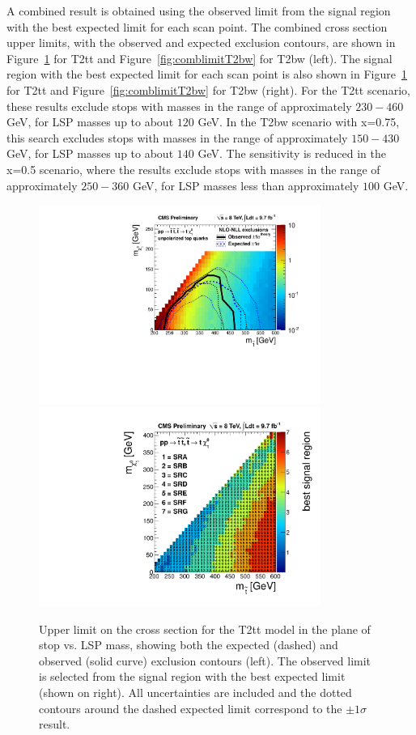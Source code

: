 A combined result is obtained using the observed limit from the signal
region with the best expected limit for each scan point. The combined cross
section upper limits, with the observed and expected exclusion contours, are
shown in Figure~\ref{fig:comblimit} for T2tt and 
Figure~\ref{fig:comblimitT2bw} for T2bw (left).
The signal region with the best expected limit for each scan point is
also shown in Figure~\ref{fig:comblimit} for T2tt and 
Figure~\ref{fig:comblimitT2bw} for T2bw (right). 
For the T2tt scenario, these results exclude stops with masses
in the range of approximately $230-460$ GeV, for LSP masses up to about
$120$ GeV. In the T2bw scenario with x=0.75, this search excludes
stops with masses in the range of approximately $150-430$ GeV, for LSP
masses up to about $140$ GeV. The sensitivity is reduced in the
x=0.5 scenario, where the results exclude stops with masses in the
range of approximately $250-360$ GeV, for LSP masses less than
approximately $100$ GeV.

 \begin{figure}[hbt]
  \begin{center}
       \includegraphics[height=6.5cm]{plots/combinePlots_T2tt.pdf}%
       \includegraphics[height=6.5cm]{plots/combinePlots_T2tt_bestSignalRegion.pdf}
    \caption{Upper limit on the cross section for the T2tt model in
      the plane of stop vs. LSP mass, showing
      both the expected (dashed) and observed (solid curve) exclusion
      contours (left). The observed
      limit is selected from the signal region with the best expected
      limit (shown on right). All uncertainties are included and the
      dotted contours around the dashed expected limit correspond to
      the $\pm 1\sigma$ result.}
\label{fig:comblimit}
      \end{center}
\end{figure}

